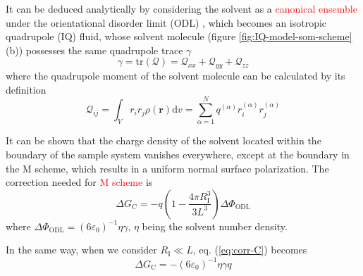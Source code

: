 It can be deduced analytically by considering the solvent as a \textcolor{red}{canonical
ensemble} under the orientational disorder limit (ODL) \citep{Kastenholz_2006_I},
which becomes an isotropic quadrupole (IQ) fluid, whose solvent molecule
(figure \ref{fig:IQ-model-som-scheme} (b)) possesses the same quadrupole
trace $\gamma$ 
\begin{equation}
\gamma=\mathrm{tr}(\mathbf{\mathcal{Q}})=\mathcal{Q}_{xx}+\mathcal{Q}_{yy}+\mathcal{Q}_{zz}
\end{equation}
where the quadrupole moment of the solvent molecule can be calculated
by its definition \citep{Multipole}
\begin{equation}
\mathcal{Q}_{ij}=\int_{V}r_{i}r_{j}\rho(\mathbf{r})\mathrm{d}v=\sum_{\alpha=1}^{N}q^{(\alpha)}r_{i}^{(\alpha)}r_{j}^{(\alpha)}
\end{equation}

It can be shown that the charge density of the solvent located within
the boundary of the sample system vanishes everywhere, except at the
boundary in the M scheme, which results in a uniform normal surface
polarization. The correction needed for\textcolor{red}{{} M scheme }is
\begin{equation}
\Delta G_{\mathrm{C}}=-q\left(1-\frac{4\pi R_{\mathrm{I}}^{3}}{3L^{3}}\right)\Delta\Phi_{\mathrm{ODL}}\label{eq:corr-C}
\end{equation}
where $\Delta\Phi_{\mathrm{ODL}}=\left(6\varepsilon_{0}\right)^{-1}\eta\gamma$,
$\eta$ being the solvent number density.

In the same way, when we consider $R_{\mathrm{I}}\ll L$, eq. (\ref{eq:corr-C})
becomes
\begin{equation}
\Delta G_{\mathrm{C}}=-\left(6\varepsilon_{0}\right)^{-1}\eta\gamma q
\end{equation}

